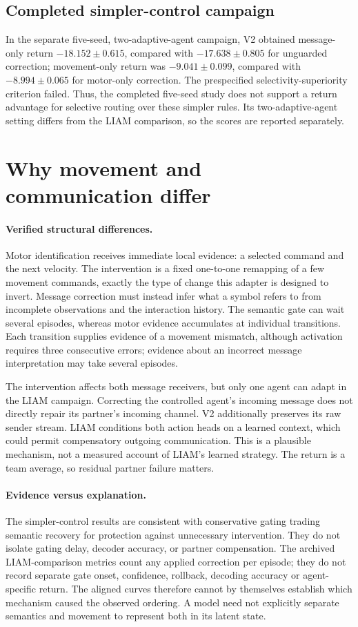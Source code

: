 \documentclass[10pt,a4paper]{article}
\begin{document}
\subsection{Completed simpler-control campaign}
In the separate five-seed, two-adaptive-agent campaign, V2 obtained message-only return $-18.152\pm0.615$, compared with $-17.638\pm0.805$ for unguarded correction; movement-only return was $-9.041\pm0.099$, compared with $-8.994\pm0.065$ for motor-only correction. The prespecified selectivity-superiority criterion failed. Thus, the completed five-seed study does not support a return advantage for selective routing over these simpler rules. Its two-adaptive-agent setting differs from the LIAM comparison, so the scores are reported separately.

\section{Why movement and communication differ}
\paragraph{Verified structural differences.}
Motor identification receives immediate local evidence: a selected command and the next velocity. The intervention is a fixed one-to-one remapping of a few movement commands, exactly the type of change this adapter is designed to invert. Message correction must instead infer what a symbol refers to from incomplete observations and the interaction history. The semantic gate can wait several episodes, whereas motor evidence accumulates at individual transitions. Each transition supplies evidence of a movement mismatch, although activation requires three consecutive errors; evidence about an incorrect message interpretation may take several episodes.

The intervention affects both message receivers, but only one agent can adapt in the LIAM campaign. Correcting the controlled agent's incoming message does not directly repair its partner's incoming channel. V2 additionally preserves its raw sender stream. LIAM conditions both action heads on a learned context, which could permit compensatory outgoing communication. This is a plausible mechanism, not a measured account of LIAM's learned strategy. The return is a team average, so residual partner failure matters.

\paragraph{Evidence versus explanation.}
The simpler-control results are consistent with conservative gating trading semantic recovery for protection against unnecessary intervention. They do not isolate gating delay, decoder accuracy, or partner compensation. The archived LIAM-comparison metrics count any applied correction per episode; they do not record separate gate onset, confidence, rollback, decoding accuracy or agent-specific return. The aligned curves therefore cannot by themselves establish which mechanism caused the observed ordering. A model need not explicitly separate semantics and movement to represent both in its latent state.
\end{document}
